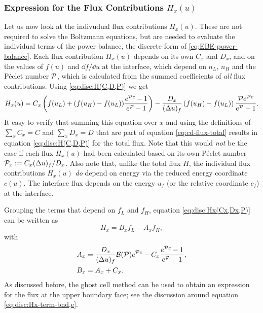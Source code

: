 \documentclass{book}
\newcommand{\Pe}[0]{{\ensuremath{{\cal P}}}}
\begin{document}
\subsubsection{Expression for the Flux Contributions $H_x(u)$}

Let us now look at the indivudual flux contributions $H_x(u)$. These are not required to solve the
Boltzmann equations, but are needed to evaluate the individual terms of the power balance, the
discrete form of \eqref{eq:EBE-power-balance}. Each flux contribution $H_x(u)$ depends on its own
$C_x$ and $D_x$, and on the values of $f(u)$ and $\dd{f}/\dd{u}$ at the interface, which depend
on $n_L$, $n_H$ and the P\'eclet number $\Pe$, which is calculated from the summed coefficients
of {\em all} flux contributions. Using \eqref{eq:disc:H(C,D,P)} we get
\begin{equation}
	H_x(u)
	= C_x\left(f(u_L) + (f(u_H)-f(u_L))\frac{e^{\Pe c}-1}{e^{\Pe}-1}\right)
	- \frac{D_x}{(\Delta u)_f}\left(f(u_H)-f(u_L)\right)\frac{\Pe e^{\Pe c}}{e^{\Pe}-1}.
	\label{eq:disc:Hx(Cx,Dx,P)}
\end{equation}
It easy to verify that summing this equation over $x$ and using the definitions of $\sum_xC_x=C$ and
$\sum_xD_x=D$ that are part of equation \eqref{eq:cd-flux-total} results in equation
\eqref{eq:disc:H(C,D,P)} for the total flux. Note that this would {\em not} be the case if each flux
$H_x(u)$ had been calculated based on its own P\'eclet number $\Pe_x:=C_x(\Delta u)_f/D_x$.
Also note that, unlike the total flux $H$, the individual flux contributions $H_x(u)$ {\em do} depend on
energy via the reduced energy coordinate $c(u)$. The interface flux depends on the energy $u_f$ (or the
relative coordinate $c_f$) at the interface.

Grouping the terms that depend on $f_L$ and $f_H$, equation \eqref{eq:disc:Hx(Cx,Dx,P)} can be written as
\begin{equation}
	H_x = B_xf_L - A_xf_H,
	\label{eq:disc:H_x(B_x,A_x)}
\end{equation}
with
\begin{align}
	A_x &= \frac{D_x}{(\Delta u)_f}{\cal B}(\Pe)e^{\Pe c} - C_x\frac{e^{\Pe c}-1}{e^{\Pe}-1},
		\label{eq:disc:A_f-exp(C,D)} \\
	B_x &= A_x + C_x.
		\label{eq:disc:B_f-exp(C,D)}
\end{align}
As discussed before, the ghost cell method can be used to obtain an expression
for the flux at the upper boundary face; see the discussion around equation
\eqref{eq:disc:Hx-term-bnd,e}.
\end{document}
